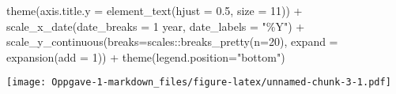 \documentclass[
]{article}
\newenvironment{Shaded}{\begin{snugshade}}{\end{snugshade}}
\newcommand{\AttributeTok}[1]{\textcolor[rgb]{0.77,0.63,0.00}{#1}}
\newcommand{\DecValTok}[1]{\textcolor[rgb]{0.00,0.00,0.81}{#1}}
\newcommand{\FloatTok}[1]{\textcolor[rgb]{0.00,0.00,0.81}{#1}}
\newcommand{\FunctionTok}[1]{\textcolor[rgb]{0.00,0.00,0.00}{#1}}
\newcommand{\NormalTok}[1]{#1}
\newcommand{\SpecialCharTok}[1]{\textcolor[rgb]{0.00,0.00,0.00}{#1}}
\newcommand{\StringTok}[1]{\textcolor[rgb]{0.31,0.60,0.02}{#1}}
\begin{document}
\begin{Shaded}
\begin{Highlighting}[]
  \FunctionTok{theme}\NormalTok{(}\AttributeTok{axis.title.y =} \FunctionTok{element\_text}\NormalTok{(}\AttributeTok{hjust =} \FloatTok{0.5}\NormalTok{, }\AttributeTok{size =} \DecValTok{11}\NormalTok{)) }\SpecialCharTok{+}
  \FunctionTok{scale\_x\_date}\NormalTok{(}\AttributeTok{date\_breaks =} \StringTok{\textquotesingle{}1 year\textquotesingle{}}\NormalTok{, }\AttributeTok{date\_labels =} \StringTok{"\%Y"}\NormalTok{) }\SpecialCharTok{+}
  \FunctionTok{scale\_y\_continuous}\NormalTok{(}\AttributeTok{breaks=}\NormalTok{scales}\SpecialCharTok{::}\FunctionTok{breaks\_pretty}\NormalTok{(}\AttributeTok{n=}\DecValTok{20}\NormalTok{),}
                     \AttributeTok{expand =} \FunctionTok{expansion}\NormalTok{(}\AttributeTok{add =} \DecValTok{1}\NormalTok{)) }\SpecialCharTok{+}
  \FunctionTok{theme}\NormalTok{(}\AttributeTok{legend.position=}\StringTok{"bottom"}\NormalTok{)}
\end{Highlighting}
\end{Shaded}

\texttt{[image: Oppgave-1-markdown\_files/figure-latex/unnamed-chunk-3-1.pdf]}
\end{document}
